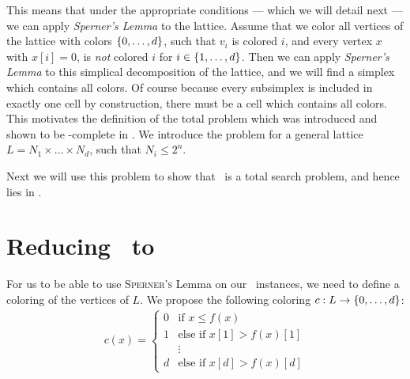 This means that under the appropriate conditions --- which we will detail next --- we can apply \textit{Sperner's Lemma} to the lattice. Assume that we color all vertices of the lattice with colors $\left\{0, \dots, d\right\}$, such that $v_i$ is colored $i$, and every vertex $x$ with $x[i] = 0$, is \textit{not} colored $i$ for $i \in \left\{1, \dots, d\right\}$. Then we can apply \textit{Sperner's Lemma} to this simplical decomposition of the lattice, and we will find a simplex which contains all colors. Of course because every subsimplex is included in exactly one cell by construction, there must be a cell which contains all colors. This motivates the definition of the total problem \Sperner which was introduced and shown to be \PPAD-complete in . We introduce the problem for a general lattice $L = N_1 \times \dots \times N_d$, such that $N_i \leq 2^n$.


Next we will use this problem to show that \Tarskistar\ is a total search problem, and hence lies in \PPAD.

\section{Reducing \Tarskistar\ to \Sperner}
\label{sec:tarskistar_to_sperner}

For us to be able to use \textsc{Sperner's} Lemma on our \Tarskistar\ instances, we need to define a coloring of the vertices of $L$. We propose the following coloring $c : L \rightarrow \left\{0, \dots, d\right\}$:
\begin{align*}
    c(x) =
    \begin{cases}
        0 & \text{if $x \leq f(x)$}         \\
        1 & \text{else if $x[1] > f(x)[1]$} \\
          & \vdots                          \\
        d & \text{else if $x[d] > f(x)[d]$}
    \end{cases}
\end{align*}

